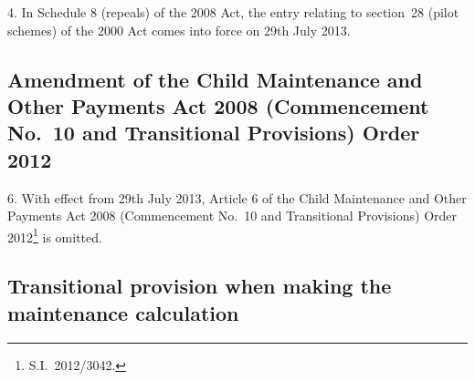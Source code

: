 \documentclass[12pt,a4paper]{article}
\begin{document}
4.  In Schedule 8 (repeals) of the 2008 Act, the entry relating to section~28 (pilot schemes) of the 2000 Act comes into force on 29th July 2013.

%
%


\subsection[6. Amendment of the Child Maintenance and Other Payments Act 2008 (Commencement No.~10 and Transitional Provisions) Order 2012]{Amendment of the Child Maintenance and Other Payments Act 2008 (Commencement No.~10 and Transitional Provisions) Order 2012}

6.  With effect from 29th July 2013, Article 6 of the Child Maintenance and Other Payments Act 2008 (Commencement No.~10 and Transitional Provisions) Order 2012\footnote{S.I.~2012/3042.} is omitted.

\subsection[7. Transitional provision when making the maintenance calculation]{Transitional provision when making the maintenance calculation}
\end{document}
